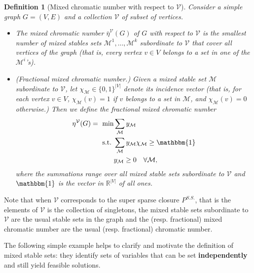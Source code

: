 \documentclass[smallextended]{svjour3}
\newtheorem{definition}[proposition]{Definition}
\begin{document}
\begin{definition}[Mixed chromatic number with respect to $\mathcal{V}$] \label{defn:chromatic}
	Consider a simple graph $G = (V,E)$ and a collection ${\mathcal{V}}$ of subset of vertices. 
	
	\begin{itemize}
		\item The \emph{mixed chromatic number} ${\bar{\eta}}^{\mathcal{V}}(G)$ of $G$ with respect to $\mathcal{V}$ is the smallest number of mixed stables sets ${\mathcal{M}}^1, \ldots, {\mathcal{M}}^k$ subordinate to ${\mathcal{V}}$ that cover all vertices of the graph (that is, every vertex $v \in V$ belongs to a set in one of the ${\mathcal{M}}^i$'s).
	
		\item (Fractional mixed chromatic number.) Given a mixed stable set ${\mathcal{M}}$ subordinate to ${\mathcal{V}}$, let $\chi_{\mathcal{M}} \in \{0,1\}^{|V|}$ denote its incidence vector (that is, for each vertex $v \in V$, $\chi_{\mathcal{M}}(v) = 1$ if $v$ belongs to a set in ${\mathcal{M}}$, and $\chi_{\mathcal{M}}(v) = 0$ otherwise.) 
Then we define the \emph{fractional mixed chromatic number} 
\begin{align}
	\eta^{\mathcal{V}}(G) = ~\min &\sum_{\mathcal{M}} y_{\mathcal{M}} \notag\\
\textup{s.t.}~& \sum_{\mathcal{M}} y_{\mathcal{M}} \chi_{\mathcal{M}} \geq {\mathbbm{1}} \label{eq:etadefn} \\
& y_{\mathcal{M}} \ge 0 ~~~\forall {\mathcal{M}}, \notag
\end{align}
where the summations range over all mixed stable sets subordinate to ${\mathcal{V}}$ and ${\mathbbm{1}}$ is the vector in $\mathbb{R}^{|V|}$ of all ones. 
	\end{itemize}
\end{definition}

Note that when $\mathcal{V}$ corresponds to the super sparse closure $P^{S.S.}$, that is the elements of $\mathcal{V}$ is the collection of singletons, the mixed stable sets subordinate to ${\mathcal{V}}$ are the usual stable sets in the graph and the (resp. fractional) mixed chromatic number are the usual (resp. fractional) chromatic number.

	The following simple example helps to clarify and motivate the definition of mixed stable sets: they identify sets of variables that can be set \textbf{independently} and still yield feasible solutions. 
\end{document}
